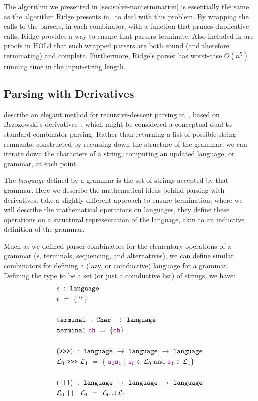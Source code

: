       The algorithm we presented in \autoref{sec:solve-nontermination} is essentially the same as the algorithm Ridge presents in~\cite{Ridge} to deal with this problem.  By wrapping the calls to the parsers, in each combinator, with a function that prunes duplicative calls, Ridge provides a way to ensure that parsers terminate.  Also included in \cite{Ridge} are proofs in HOL4 that such wrapped parsers are both sound (and therefore terminating) and complete.  Furthermore, Ridge's parser has worst-case $O(n^5)$ running time in the input-string length.

  \subsection{Parsing with Derivatives}
     describe an elegant method for recursive-descent parsing in~\cite{Derivs}, based on Brzozowski's derivatives~\cite{BrzozowskiDerivs}, which might be considered a conceptual dual to standard combinator parsing.  Rather than returning a list of possible string remnants, constructed by recursing down the structure of the grammar, we can iterate down the characters of a string, computing an updated language, or grammar, at each point.
    
    The \emph{language} defined by a grammar is the set of strings accepted by that grammar.  Here we describe the mathematical ideas behind parsing with derivatives.  \citeauthor*{Derivs} take a slightly different approach to ensure termination; where we will describe the mathematical operations on languages, they define these operations on a structural representation of the language, akin to an inductive definition of the grammar.
    
    Much as we defined parser combinators for the elementary operations of a grammar ($\epsilon$, terminals, sequencing, and alternatives), we can define similar combinators for defining a (lazy, or coinductive) language for a grammar.  Defining the type  to be a set (or just a coinductive list) of strings, we have:
\begin{align*}
& \epsilon~:~\fname{language} \\
& \epsilon~=~\{\str{}\} \\ \\
& \fname{terminal}~:~\indname{Char}~\to~\fname{language} \\
& \fname{terminal}~\farg{ch}~=~\{\farg{ch}\} \\ \\
& (\fname{\sequencing})~:~\fname{language}~\to~\fname{language}~\to~\fname{language} \\
& \mathcal{L}_0~\fname{\sequencing}~\mathcal{L}_1~=~\{~\strcat{\farg{s\ensuremath{_0}}}{\farg{s\ensuremath{_1}}}~|~\farg{s\ensuremath{_0}}\in\mathcal L_0\text{ and }\farg{s\ensuremath{_1}}\in\mathcal{L}_1 \} \\ \\
& (\fname{|||})~:~\fname{language}~\to~\fname{language}~\to~\fname{language} \\
& \mathcal{L}_0~\fname{|||}~\mathcal{L}_1~=~\mathcal L_0\cup\mathcal L_1
\end{align*}

